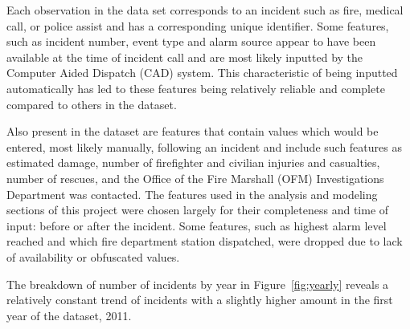 \documentclass[12pt,letterpaper, oneside]
{article}
\begin{document}
Each observation in the data set corresponds to an incident such as fire, medical call, or police assist and has a corresponding unique identifier. Some features, such as incident number, event type and alarm source appear to have been available at the time of incident call and are most likely inputted by the Computer Aided Dispatch (CAD) system. This characteristic of being inputted automatically has led to these features being relatively reliable and complete compared to others in the dataset. 

Also present in the dataset are features that contain values which would be entered, most likely manually, following an incident and include such features as estimated damage, number of firefighter and civilian injuries and casualties, number of rescues, and the Office of the Fire Marshall (OFM) Investigations Department was contacted. The features used in the analysis and modeling sections of this project were chosen largely for their completeness and time of input: before or after the incident. Some features, such as highest alarm level reached and which fire department station dispatched, were dropped due to lack of availability or obfuscated values. 

The breakdown of number of incidents by year in Figure~\ref{fig:yearly} reveals a relatively constant trend of incidents with a slightly higher amount in the first year of the dataset, 2011. 
\end{document}

